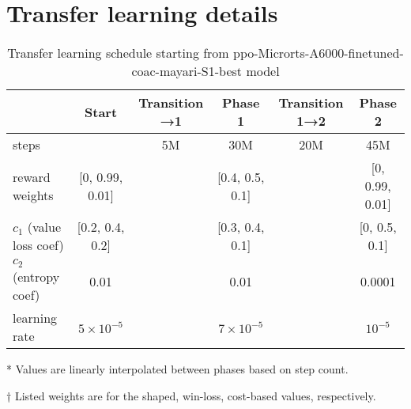\documentclass{article}
\begin{document}
\section{Transfer learning details}

\begin{table}[H]
    \centering
    \begin{threeparttable}
    \caption{Transfer learning schedule starting from ppo-Microrts-A6000-finetuned-coac-mayari-S1-best model}
    \label{tab:transfer-learning-schedule}
    \begin{tabular}{lccccc}
    \toprule
     & Start & Transition →1\tnote{*} & Phase 1 & Transition 1→2\tnote{*} & Phase 2 \\
     \midrule
    steps & & 5M & 30M & 20M & 45M \\
    reward weights\tnote{†} & [0, 0.99, 0.01] & & [0.4, 0.5, 0.1] & & [0, 0.99, 0.01] \\
    $c_1$ (value loss coef)\tnote{†} & [0.2, 0.4, 0.2] & & [0.3, 0.4, 0.1] & & [0, 0.5, 0.1]\\
    $c_2$ (entropy coef) & 0.01 & & 0.01 & & 0.0001 \\
    learning rate & $5 \times 10^{-5}$ & & $7 \times 10^{-5}$ & & $10^{-5}$ \\
    \bottomrule
    \end{tabular}
    \begin{tablenotes}
       \item[*] Values are linearly interpolated between phases based on step count.
       \item[†] Listed weights are for the shaped, win-loss, cost-based values, respectively.
    \end{tablenotes}
    \end{threeparttable}
\end{table}
\end{document}
